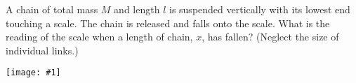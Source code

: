 \documentclass[12pt,letterpaper]{hmcpset}
\newcommand{\diagram}[1]{\begin{center} \texttt{[image: \#1]} \end{center}}
\begin{document}
\begin{solution}
    \vfill
\end{solution}
\newpage

\begin{problem}
  A chain of total mass $M$ and length $l$ is suspended vertically with its
  lowest end touching a scale. The chain is released and falls onto the
  scale. What is the reading of the scale when a length of chain, $x$, has
  fallen? (Neglect the size of individual links.)
  \diagram{img/5_10.png}
\end{problem}

\begin{solution}
    \vfill
\end{solution}
\newpage
\end{document}
